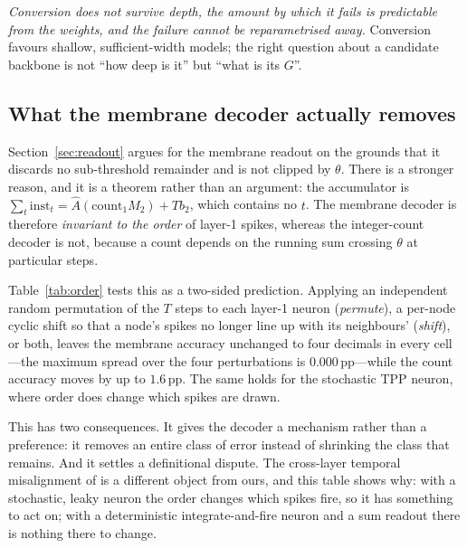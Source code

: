 \documentclass[10pt,twocolumn]{article}
\newcommand{\Ahat}{\hat{A}}
\newcommand{\tabref}[1]{Table~\ref{#1}}
\newcommand{\secref}[1]{Section~\ref{#1}}
\begin{document}
\emph{Conversion does not survive depth, the amount by which it fails is predictable from the
weights, and the failure cannot be reparametrised away.} Conversion favours shallow, sufficient-width models; the
right question about a candidate backbone is not ``how deep is it'' but ``what is its $G$''.

\subsection{What the membrane decoder actually removes}
\label{sec:order}

\secref{sec:readout} argues for the membrane readout on the grounds that it discards no
sub-threshold remainder and is not clipped by $\theta$. There is a stronger reason, and it is a
theorem rather than an argument: the accumulator is
$\sum_{t}\mathrm{inst}_{t}=\Ahat(\mathrm{count}_{1}M_{2})+Tb_{2}$, which contains no $t$.
The membrane decoder is therefore \emph{invariant to the order} of layer-1 spikes, whereas the
integer-count decoder is not, because a count depends on the running sum crossing $\theta$ at
particular steps.

\tabref{tab:order} tests this as a two-sided prediction. Applying an independent random permutation
of the $T$ steps to each layer-1 neuron (\emph{permute}), a per-node cyclic shift so that a node's
spikes no longer line up with its neighbours' (\emph{shift}), or both, leaves the membrane accuracy
unchanged to four decimals in every cell---the maximum spread over the four perturbations is
$0.000$\,pp---while the count accuracy moves by up to $1.6$\,pp. The same holds for the stochastic
TPP neuron, where order does change which spikes are drawn.

This has two consequences. It gives the decoder a mechanism rather than a preference: it removes an
entire class of error instead of shrinking the class that remains. And it settles a definitional
dispute. The cross-layer temporal misalignment of \citet{bojkovic2025temporal} is a different object
from ours, and this table shows why: with a stochastic, leaky neuron the order changes which spikes
fire, so it has something to act on; with a deterministic integrate-and-fire neuron and a sum
readout there is nothing there to change.
\end{document}
